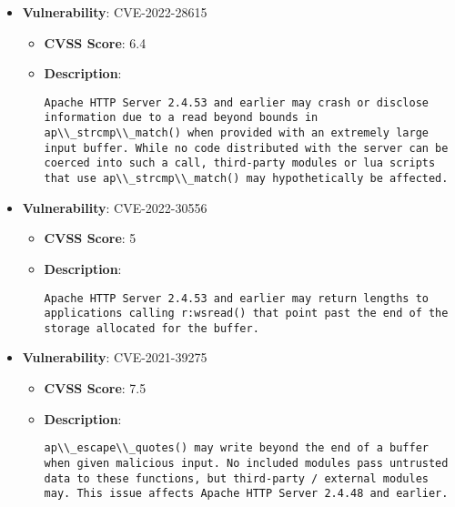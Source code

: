 \documentclass{article}
\begin{document}
\begin{itemize}
        \item \textbf{Vulnerability}: CVE-2022-28615
        \begin{itemize}
            \item \textbf{CVSS Score}:  6.4 
            \item \textbf{Description}:
            \parbox[t]{0.9\linewidth}{
                \verb|Apache HTTP Server 2.4.53 and earlier may crash or disclose information due to a read beyond bounds in ap\\_strcmp\\_match() when provided with an extremely large input buffer. While no code distributed with the server can be coerced into such a call, third-party modules or lua scripts that use ap\\_strcmp\\_match() may hypothetically be affected.|
            }
        \end{itemize}
    
        \item \textbf{Vulnerability}: CVE-2022-30556
        \begin{itemize}
            \item \textbf{CVSS Score}:  5 
            \item \textbf{Description}:
            \parbox[t]{0.9\linewidth}{
                \verb|Apache HTTP Server 2.4.53 and earlier may return lengths to applications calling r:wsread() that point past the end of the storage allocated for the buffer.|
            }
        \end{itemize}
    
        \item \textbf{Vulnerability}: CVE-2021-39275
        \begin{itemize}
            \item \textbf{CVSS Score}:  7.5 
            \item \textbf{Description}:
            \parbox[t]{0.9\linewidth}{
                \verb|ap\\_escape\\_quotes() may write beyond the end of a buffer when given malicious input. No included modules pass untrusted data to these functions, but third-party / external modules may. This issue affects Apache HTTP Server 2.4.48 and earlier.|
            }
        \end{itemize}
    
\end{itemize}
\end{document}
